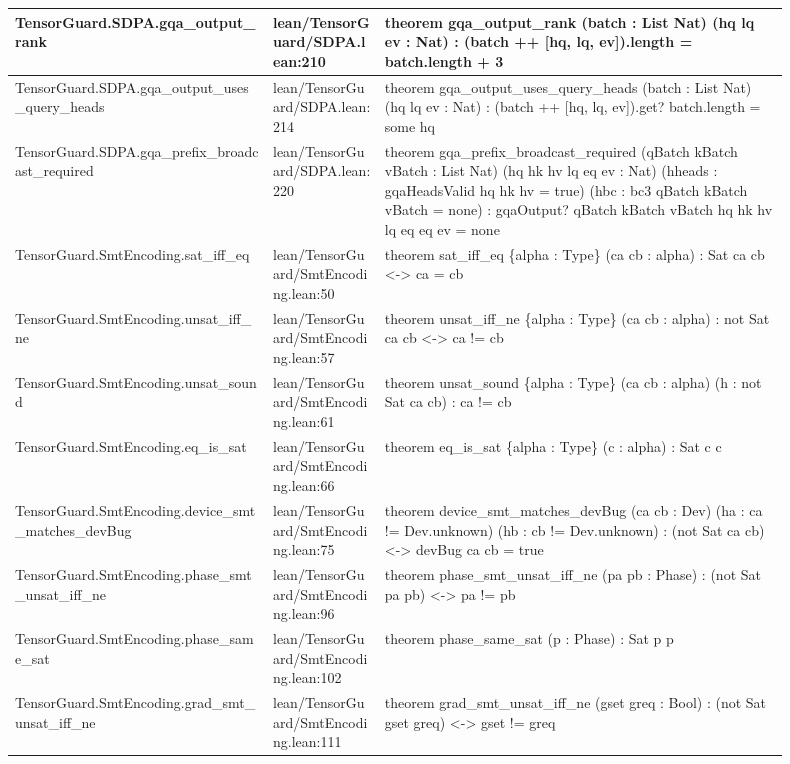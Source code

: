\documentclass[10pt]{article}
\begin{document}
\begin{longtable}{|p{0.30\linewidth}|p{0.13\linewidth}|p{0.47\linewidth}|}
\hline
TensorGuard.SDPA.gqa\_output\_rank & lean/TensorGuard/SDPA.lean:210 & theorem gqa\_output\_rank (batch : List Nat) (hq lq ev : Nat) : (batch ++ [hq, lq, ev]).length = batch.length + 3 \\
\hline
TensorGuard.SDPA.gqa\_output\_uses\_query\_heads & lean/TensorGuard/SDPA.lean:214 & theorem gqa\_output\_uses\_query\_heads (batch : List Nat) (hq lq ev : Nat) : (batch ++ [hq, lq, ev]).get? batch.length = some hq \\
\hline
TensorGuard.SDPA.gqa\_prefix\_broadcast\_required & lean/TensorGuard/SDPA.lean:220 & theorem gqa\_prefix\_broadcast\_required (qBatch kBatch vBatch : List Nat) (hq hk hv lq eq ev : Nat) (hheads : gqaHeadsValid hq hk hv = true) (hbc : bc3 qBatch kBatch vBatch = none) : gqaOutput? qBatch kBatch vBatch hq hk hv lq eq eq ev = none \\
\hline
TensorGuard.SmtEncoding.sat\_iff\_eq & lean/TensorGuard/SmtEncoding.lean:50 & theorem sat\_iff\_eq \{alpha : Type\} (ca cb : alpha) : Sat ca cb <-> ca = cb \\
\hline
TensorGuard.SmtEncoding.unsat\_iff\_ne & lean/TensorGuard/SmtEncoding.lean:57 & theorem unsat\_iff\_ne \{alpha : Type\} (ca cb : alpha) : not  Sat ca cb <-> ca != cb \\
\hline
TensorGuard.SmtEncoding.unsat\_sound & lean/TensorGuard/SmtEncoding.lean:61 & theorem unsat\_sound \{alpha : Type\} (ca cb : alpha) (h : not  Sat ca cb) : ca != cb \\
\hline
TensorGuard.SmtEncoding.eq\_is\_sat & lean/TensorGuard/SmtEncoding.lean:66 & theorem eq\_is\_sat \{alpha : Type\} (c : alpha) : Sat c c \\
\hline
TensorGuard.SmtEncoding.device\_smt\_matches\_devBug & lean/TensorGuard/SmtEncoding.lean:75 & theorem device\_smt\_matches\_devBug (ca cb : Dev) (ha : ca != Dev.unknown) (hb : cb != Dev.unknown) : (not  Sat ca cb) <-> devBug ca cb = true \\
\hline
TensorGuard.SmtEncoding.phase\_smt\_unsat\_iff\_ne & lean/TensorGuard/SmtEncoding.lean:96 & theorem phase\_smt\_unsat\_iff\_ne (pa pb : Phase) : (not  Sat pa pb) <-> pa != pb \\
\hline
TensorGuard.SmtEncoding.phase\_same\_sat & lean/TensorGuard/SmtEncoding.lean:102 & theorem phase\_same\_sat (p : Phase) : Sat p p \\
\hline
TensorGuard.SmtEncoding.grad\_smt\_unsat\_iff\_ne & lean/TensorGuard/SmtEncoding.lean:111 & theorem grad\_smt\_unsat\_iff\_ne (gset greq : Bool) : (not  Sat gset greq) <-> gset != greq \\

\end{longtable}
\end{document}
